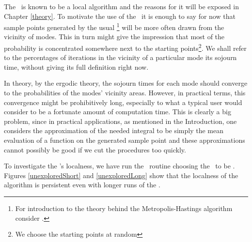 The \MH\, is known to be a local algorithm and the reasons for it will be exposed in Chapter \ref{theory}. To motivate the use of the \PT\, it is enough to say for now that sample points generated by the usual \MH\footnote{For introduction to the theory behind the Metropolis-Hastings algorithm consider \cite{CharlesJ.Geyer}.} will be more often drawn from the vicinity of modes. This in turn might give the impression that most of the probability is concentrated somewhere next to the starting points\footnote{We choose the starting points at random}. We shall refer to the percentages of iterations in the vicinity of a particular mode its sojourn time, without giving its full definition right now.

In theory, by the ergodic theory, the sojourn times for each mode should converge to the probabilities of the modes' vicinity areas. However, in practical terms, this convergence might be prohibitively long, especially to what a typical user would consider to be a fortunate amount of computation time. This is clearly a big problem, since in practical applications, as mentioned in the Introduction, one considers the approximation of the needed integral to be simply the mean evaluation of a function on the generated sample point and these approximations cannot possibly be good if we cut the procedures too quickly. 

To investigate the \MH's localness, we have run the \Metro\, routine choosing the \sspace\, to be \realTemp. Figures \ref{unexploredShort} and \ref{unexploredLong} show that the localness of the algorithm is persistent even with longer runs of the \MH.  

